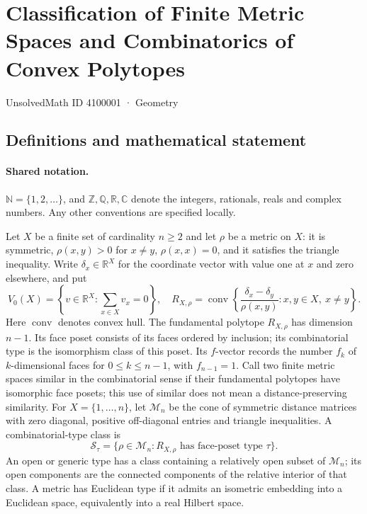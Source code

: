 \documentclass[11pt]{article}
\begin{document}
\setcounter{section}{4100000}
\section{Classification of Finite Metric Spaces and Combinatorics of Convex Polytopes}\label{4100001}
{\small\sffamily UnsolvedMath ID 4100001 · Geometry}
\subsection{Definitions and mathematical statement}

\paragraph{Shared notation.}$\mathbb N=\{1,2,\ldots\}$, and $\mathbb Z,\mathbb Q,\mathbb R,\mathbb C$ denote the integers, rationals, reals and complex numbers. Any other conventions are specified locally.


Let \(X\) be a finite set of cardinality \(n\ge2\) and let \(\rho\) be a metric on \(X\): it is symmetric, \(\rho(x,y)>0\) for \(x\ne y\), \(\rho(x,x)=0\), and it satisfies the triangle inequality. Write \(\delta_x\in\mathbb R^X\) for the coordinate vector with value one at \(x\) and zero elsewhere, and put
\[V_0(X)=\left\{v\in\mathbb R^X:\sum_{x\in X}v_x=0\right\},\quad
R_{X,\rho}=\operatorname{conv}\left\{\frac{\delta_x-\delta_y}{\rho(x,y)}:x,y\in X,\ x\ne y\right\}.\]
Here \(\operatorname{conv}\) denotes convex hull. The fundamental polytope \(R_{X,\rho}\) has dimension \(n-1\). Its face poset consists of its faces ordered by inclusion; its combinatorial type is the isomorphism class of this poset. Its \(f\)-vector records the number \(f_k\) of \(k\)-dimensional faces for \(0\le k\le n-1\), with \(f_{n-1}=1\). Call two finite metric spaces similar in the combinatorial sense if their fundamental polytopes have isomorphic face posets; this use of similar does not mean a distance-preserving similarity.
For \(X=\{1,\ldots,n\}\), let \(\mathcal M_n\) be the cone of symmetric distance matrices with zero diagonal, positive off-diagonal entries and triangle inequalities. A combinatorial-type class is
\[\mathcal S_\tau=\{\rho\in\mathcal M_n:R_{X,\rho}\text{ has face-poset type }\tau\}.\]
An open or generic type has a class containing a relatively open subset of \(\mathcal M_n\); its open components are the connected components of the relative interior of that class. A metric has Euclidean type if it admits an isometric embedding into a Euclidean space, equivalently into a real Hilbert space.
\end{document}
